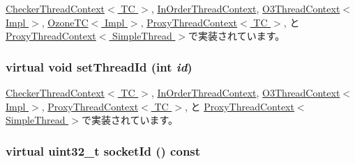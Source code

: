 \hyperlink{classCheckerThreadContext_abbe779fa43c72cd485ddb736ab17ff61}{CheckerThreadContext$<$ TC $>$}, \hyperlink{classInOrderThreadContext_abbe779fa43c72cd485ddb736ab17ff61}{InOrderThreadContext}, \hyperlink{classO3ThreadContext_af236f8e23dce0c08a46c19ebfdb1aaaf}{O3ThreadContext$<$ Impl $>$}, \hyperlink{classOzoneCPU_1_1OzoneTC_abbe779fa43c72cd485ddb736ab17ff61}{OzoneTC$<$ Impl $>$}, \hyperlink{classProxyThreadContext_abbe779fa43c72cd485ddb736ab17ff61}{ProxyThreadContext$<$ TC $>$}, と \hyperlink{classProxyThreadContext_abbe779fa43c72cd485ddb736ab17ff61}{ProxyThreadContext$<$ SimpleThread $>$}で実装されています。\hypertarget{classThreadContext_a8ab94437bf0aaa86face2bc4b2dfa138}{
\subsubsection[{setThreadId}]{\setlength{\rightskip}{0pt plus 5cm}virtual void setThreadId (int {\em id})}}
\label{classThreadContext_a8ab94437bf0aaa86face2bc4b2dfa138}


\hyperlink{classCheckerThreadContext_a9186b553811fbde99263b3fd831f1b0c}{CheckerThreadContext$<$ TC $>$}, \hyperlink{classInOrderThreadContext_a9186b553811fbde99263b3fd831f1b0c}{InOrderThreadContext}, \hyperlink{classO3ThreadContext_ad657dfeae3efbb82eeb0b82b1337217a}{O3ThreadContext$<$ Impl $>$}, \hyperlink{classProxyThreadContext_a9186b553811fbde99263b3fd831f1b0c}{ProxyThreadContext$<$ TC $>$}, と \hyperlink{classProxyThreadContext_a9186b553811fbde99263b3fd831f1b0c}{ProxyThreadContext$<$ SimpleThread $>$}で実装されています。\hypertarget{classThreadContext_aba2c497e8af03f742e5ece80efaeb197}{
\subsubsection[{socketId}]{\setlength{\rightskip}{0pt plus 5cm}virtual {\bf uint32\_\-t} socketId () const}}
\label{classThreadContext_aba2c497e8af03f742e5ece80efaeb197}


